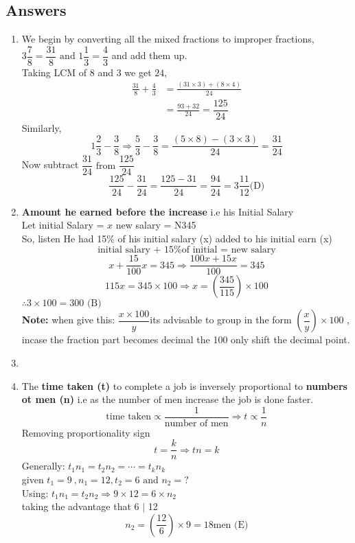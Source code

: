 \subsection{Answers}
\begin{multicols}{2}
\begin{enumerate}[label={\arabic*.}]
    \item We begin by converting all the mixed fractions to improper fractions,\\
    \(3\dfrac{7}{8} = \dfrac{31}{8} \text { and } 1\dfrac{1}{3} = \dfrac{4}{3}\) and add them up. \\ 
    Taking LCM of \(8\) and \(3\) we get \(24\),
    \begin{align*}
    \frac{31}{8} + \frac{4}{3} &= \frac{(31 \times 3) + (8 \times 4) }{24} \\
    &= \frac{93 + 32}{24} = \dfrac{125}{24}
    \end{align*}
    Similarly, 
    \[1\frac{2}{3} - \frac{3}{8} \Rightarrow \frac{5}{3} - \frac{3}{8} = \frac{(5 \times 8) - (3 \times 3)}{24} = \frac{31}{24}\]
    Now subtract \(\dfrac{31}{24} \text { from } \dfrac{125}{24}\)
    \[\frac{125}{24} - \frac{31}{24} = \frac{125 - 31}{24} = \frac{94}{24} = 3\frac{11}{12} \text{(D)} \]
    
    \item \textbf{Amount he earned before the increase} i.e his Initial Salary \\
    Let initial Salary = \(x\) \hspace {10px}  new salary = N345\\
    So, listen He had 15\% of his initial salary (x) added to his initial earn (x)
    \[\text{initial salary + 15\% of initial = new salary}\]
    \[x + \dfrac{15}{100}x = 345 \Rightarrow \dfrac{100x + 15x}{100} = 345\]
    \[115x = 345 \times 100 \Rightarrow x = \left(\frac{345}{115}\right) \times 100\]
    \(\therefore 3 \times 100 = 300 \text{ (B)}\)\\
    \textbf{Note:} when give this: \( \dfrac{x \times 100}{y}\)its advisable to group in the form
    \(\left(\dfrac{x}{y}\right) \times 100\) , incase the fraction part becomes decimal the 100 only shift the
    decimal point. 

    \item
    \item The \textbf{time taken (t)} to complete a job is inversely proportional to \textbf{numbers ot men (n)} 
    i.e as the number of men increase the job is done faster. 
    \begin{equation}
        \text{time taken} \propto \dfrac{1}{\text{number of men}} \Rightarrow t \propto \dfrac{1}{n}
    \end{equation}
    Removing proportionality sign
    \[t = \dfrac{k}{n} \Rightarrow tn = k\]
    Generally: \(t_{1}n_{1} = t_{2}n_2 = \cdots = t_{k}n_{k}\)\\
    given \(t_{1} = 9\ , n_{1} = 12 , t_{2} = 6 \text{ and } n_{2} = ?\) \\
    Using: \(t_{1}n_{1} = t_{2}n_{2} \Rightarrow 9 \times 12 = 6 \times n_{2}\) \\
    taking the advantage that 6 $\mid$ 12 
    \[n_{2} = \left(\frac{12}{6}\right) \times 9 = 18 \text{men (E)}\]


\end{enumerate}
\end{multicols}
